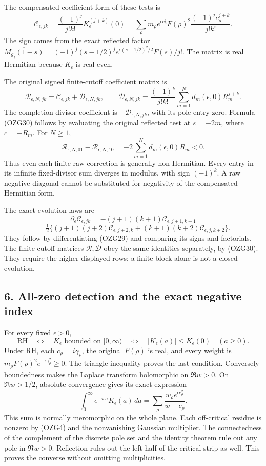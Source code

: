 \documentclass[
  10pt,
  a4paper,
]{article}
\begin{document}
The compensated coefficient form of these tests is \[
\mathcal C_{\epsilon,jk}
=\frac{(-1)^j}{j!k!}K_\epsilon^{(j+k)}(0)
=\sum_\rho m_\rho e^{\epsilon c_\rho^2}F(\rho)^2
\frac{(-1)^jc_\rho^{j+k}}{j!k!}.
\tag{OZG29}
\] The sign comes from the exact reflected factor
\(\overline{M_{g_j}(1-\bar s)}=(-1)^j(s-1/2)^j
e^{\epsilon(s-1/2)^2/2}F(s)/j!\). The matrix is real Hermitian because
\(K_\epsilon\) is real even.

The original signed finite-cutoff coefficient matrix is \[
\mathcal R_{\epsilon,N,jk}
=\mathcal C_{\epsilon,jk}+\mathcal D_{\epsilon,N,jk},\qquad
\mathcal D_{\epsilon,N,jk}
=\frac{(-1)^k}{j!k!}
\sum_{m=1}^{N}d_m(\epsilon,0)R_m^{j+k}.
\tag{OZG30}
\] The completion-divisor coefficient is
\(-\mathcal D_{\epsilon,N,jk}\), with its pole entry zero. Formula
(OZG30) follows by evaluating the original reflected test at \(s=-2m\),
where \(c=-R_m\). For \(N\ge1\), \[
\mathcal R_{\epsilon,N,01}-\mathcal R_{\epsilon,N,10}
=-2\sum_{m=1}^{N}d_m(\epsilon,0)R_m<0.
\tag{OZG31}
\] Thus even each finite raw correction is generally non-Hermitian.
Every entry in its infinite fixed-divisor sum diverges in modulus, with
sign \((-1)^k\). A raw negative diagonal cannot be substituted for
negativity of the compensated Hermitian form.

The exact evolution laws are \[
\partial_\epsilon\mathcal C_{\epsilon,jk}
=-(j+1)(k+1)\mathcal C_{\epsilon,j+1,k+1}
\] \[
=\tfrac12\{(j+1)(j+2)\mathcal C_{\epsilon,j+2,k}
+(k+1)(k+2)\mathcal C_{\epsilon,j,k+2}\}.
\tag{OZG32}
\] They follow by differentiating (OZG29) and comparing its signs and
factorials. The finite-cutoff matrices \(\mathcal R,\mathcal D\) obey
the same identities separately, by (OZG30). They require the higher
displayed rows; a finite block alone is not a closed evolution.

\subsection{6. All-zero detection and the exact negative
index}\label{all-zero-detection-and-the-exact-negative-index}

For every fixed \(\epsilon>0\), \[
\mathrm{RH}\quad\Longleftrightarrow\quad
K_\epsilon\text{ bounded on }[0,\infty)
\quad\Longleftrightarrow\quad
|K_\epsilon(a)|\le K_\epsilon(0)\quad(a\ge0).
\tag{OZG33}
\] Under RH, each \(c_\rho=i\gamma_\rho\), the original \(F(\rho)\) is
real, and every weight is
\(m_\rho F(\rho)^2e^{-\epsilon\gamma_\rho^2}\ge0\). The triangle
inequality proves the last condition. Conversely boundedness makes the
Laplace transform holomorphic on \(\Re w>0\). On \(\Re w>1/2\), absolute
convergence gives its exact expression \[
\int_0^\infty e^{-wa}K_\epsilon(a)\,da
=\sum_\rho\frac{w_\rho e^{\epsilon c_\rho^2}}{w-c_\rho}.
\tag{OZG34}
\] This sum is normally meromorphic on the whole plane. Each
off-critical residue is nonzero by (OZG4) and the nonvanishing Gaussian
multiplier. The connectedness of the complement of the discrete pole set
and the identity theorem rule out any pole in \(\Re w>0\). Reflection
rules out the left half of the critical strip as well. This proves the
converse without omitting multiplicities.
\end{document}
